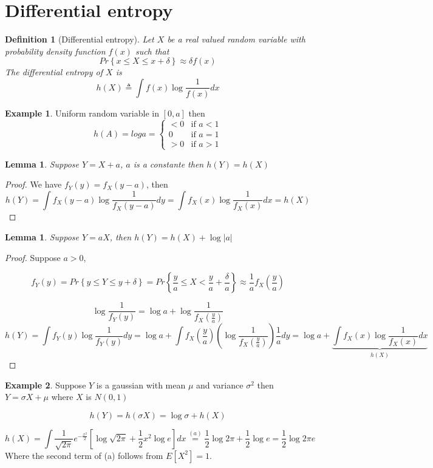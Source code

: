 \documentclass{article}
\newtheorem{lemma}[theorem]{Lemma}
\newtheorem{definition}{Definition}[section]
\theoremstyle{definition} %
\newtheorem{example}{Example}
\renewcommand{\Pr}[1]{Pr\left\{#1\right\}}
\newcommand{\Ex}[1]{E\left[#1\right]}
\newcommand{\pfrac}[2]{\left( \frac{#1}{#2} \right)}
\newcommand{\overeq}[1]{\stackrel{#1}{=}}
\begin{document}
\section{Differential entropy}

\begin{definition}[Differential entropy]
  Let $X$ be a real valued random variable with probability density function $f(x)$ such that
  \[
    \Pr{x \leq X \leq x + \delta} \approx \delta f(x)
  \]
  The differential entropy of $X$ is
  \[
    h(X) \triangleq \int f(x) \log \frac 1 {f(x)} dx
  \]
\end{definition}

\begin{example}
  Uniform random variable in $[0,a]$ then \[
    h(A) = log a = \begin{cases}
      < 0 & \text{if } a < 1\\
      0 & \text{if } a = 1\\
      > 0 & \text{if } a > 1
    \end{cases}
  \]
\end{example}

\begin{lemma}
  Suppose $Y=X+a$, $a$ is a constante then $h(Y)=h(X)$
\end{lemma}

\begin{proof}
  We have $f_Y(y) = f_X(y-a)$, then
  \[
    h(Y) = \int f_X(y-a) \log \frac 1 {f_X(y-a)}dy = \int f_X(x) \log \frac 1 {f_X(x)}dx = h(X)
  \]
\end{proof}

\begin{lemma}
  Suppose $Y=aX$, then $h(Y) = h(X) + \log |a|$
\end{lemma}

\begin{proof}
  Suppose $a > 0$,

  \[
    f_Y(y) = \Pr{y\leq Y \leq y + \delta} = \Pr{\frac y a \leq X < \frac y a + \frac \delta a} \approx \frac 1 a f_X \pfrac y a
  \]

  \[
    \log \frac 1 {f_Y(y)} = \log a + \log \frac 1 {f_X\pfrac y a}
  \]
  \[
    h(Y) = \int f_Y(y) \log \frac 1 {f_Y(y)} dy = \log a + \int f_X \pfrac y a \left(\log \frac 1 {f_X\pfrac y a} \right) \frac 1 a dy = \log a + \underbrace{\int f_X(x) \log \frac 1 {f_X(x)} dx}_{h(X)}
  \]
\end{proof}

\begin{example}
  Suppose $Y$ is a gaussian with mean $\mu$ and variance $\sigma^2$ then $Y=\sigma X + \mu$ where $X$ is $N(0,1)$

  \[
    h(Y) = h(\sigma X) = \log \sigma + h(X)
  \]

  \[
    h(X) = \int \frac 1 {\sqrt{2\pi}} e^{-\frac {x^2} 2} \left[ \log \sqrt{2\pi} + \frac 1 2 x^2 \log e \right] dx
    \overeq{(a)} \frac 1 2 \log 2\pi + \frac 1 2 \log e = \frac 1 2 \log 2\pi e
  \]
  Where the second term of (a) follows from $\Ex{X^2} = 1$.
\end{example}
\end{document}
